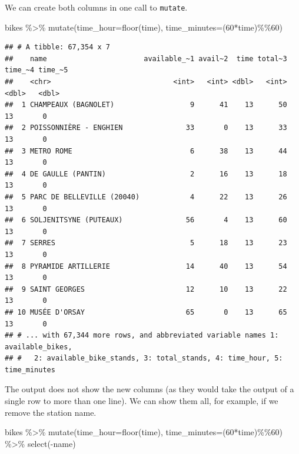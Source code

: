 \documentclass[
]{book}
\newenvironment{Shaded}{\begin{snugshade}}{\end{snugshade}}
\newcommand{\AttributeTok}[1]{\textcolor[rgb]{0.77,0.63,0.00}{#1}}
\newcommand{\DecValTok}[1]{\textcolor[rgb]{0.00,0.00,0.81}{#1}}
\newcommand{\FunctionTok}[1]{\textcolor[rgb]{0.00,0.00,0.00}{#1}}
\newcommand{\NormalTok}[1]{#1}
\newcommand{\SpecialCharTok}[1]{\textcolor[rgb]{0.00,0.00,0.00}{#1}}
\begin{document}
We can create both columns in one call to \texttt{mutate}.

\begin{Shaded}
\begin{Highlighting}[]
\NormalTok{bikes }\SpecialCharTok{\%\textgreater{}\%}
  \FunctionTok{mutate}\NormalTok{(}\AttributeTok{time\_hour=}\FunctionTok{floor}\NormalTok{(time), }\AttributeTok{time\_minutes=}\NormalTok{(}\DecValTok{60}\SpecialCharTok{*}\NormalTok{time)}\SpecialCharTok{\%\%}\DecValTok{60}\NormalTok{)}
\end{Highlighting}
\end{Shaded}

\begin{verbatim}
## # A tibble: 67,354 x 7
##    name                       available_~1 avail~2  time total~3 time_~4 time_~5
##    <chr>                             <int>   <int> <dbl>   <int>   <dbl>   <dbl>
##  1 CHAMPEAUX (BAGNOLET)                  9      41    13      50      13       0
##  2 POISSONNIÈRE - ENGHIEN               33       0    13      33      13       0
##  3 METRO ROME                            6      38    13      44      13       0
##  4 DE GAULLE (PANTIN)                    2      16    13      18      13       0
##  5 PARC DE BELLEVILLE (20040)            4      22    13      26      13       0
##  6 SOLJENITSYNE (PUTEAUX)               56       4    13      60      13       0
##  7 SERRES                                5      18    13      23      13       0
##  8 PYRAMIDE ARTILLERIE                  14      40    13      54      13       0
##  9 SAINT GEORGES                        12      10    13      22      13       0
## 10 MUSÉE D'ORSAY                        65       0    13      65      13       0
## # ... with 67,344 more rows, and abbreviated variable names 1: available_bikes,
## #   2: available_bike_stands, 3: total_stands, 4: time_hour, 5: time_minutes
\end{verbatim}

The output does not show the new columns (as they would take the output of a single row to more than one line). We can show them all, for example, if we remove the station name.

\begin{Shaded}
\begin{Highlighting}[]
\NormalTok{bikes }\SpecialCharTok{\%\textgreater{}\%}
  \FunctionTok{mutate}\NormalTok{(}\AttributeTok{time\_hour=}\FunctionTok{floor}\NormalTok{(time), }\AttributeTok{time\_minutes=}\NormalTok{(}\DecValTok{60}\SpecialCharTok{*}\NormalTok{time)}\SpecialCharTok{\%\%}\DecValTok{60}\NormalTok{) }\SpecialCharTok{\%\textgreater{}\%}
  \FunctionTok{select}\NormalTok{(}\SpecialCharTok{{-}}\NormalTok{name)}
\end{Highlighting}
\end{Shaded}
\end{document}
